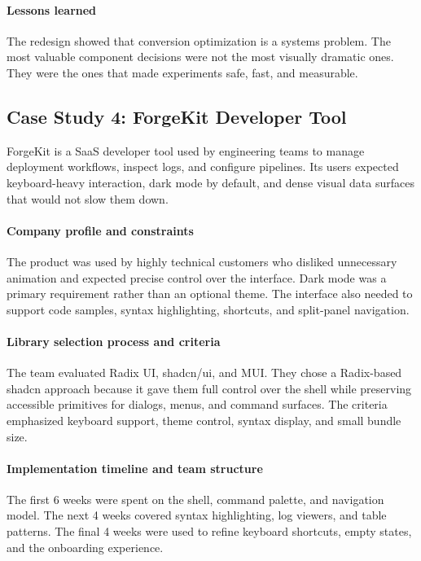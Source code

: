 \paragraph{Lessons learned}
The redesign showed that conversion optimization is a systems problem. The most valuable component decisions were not the most visually dramatic ones. They were the ones that made experiments safe, fast, and measurable.

\subsection{Case Study 4: ForgeKit Developer Tool}
ForgeKit is a SaaS developer tool used by engineering teams to manage deployment workflows, inspect logs, and configure pipelines. Its users expected keyboard-heavy interaction, dark mode by default, and dense visual data surfaces that would not slow them down.

\paragraph{Company profile and constraints}
The product was used by highly technical customers who disliked unnecessary animation and expected precise control over the interface. Dark mode was a primary requirement rather than an optional theme. The interface also needed to support code samples, syntax highlighting, shortcuts, and split-panel navigation.

\paragraph{Library selection process and criteria}
The team evaluated Radix UI, shadcn/ui, and MUI. They chose a Radix-based shadcn approach because it gave them full control over the shell while preserving accessible primitives for dialogs, menus, and command surfaces. The criteria emphasized keyboard support, theme control, syntax display, and small bundle size.

\paragraph{Implementation timeline and team structure}
The first 6 weeks were spent on the shell, command palette, and navigation model. The next 4 weeks covered syntax highlighting, log viewers, and table patterns. The final 4 weeks were used to refine keyboard shortcuts, empty states, and the onboarding experience.

